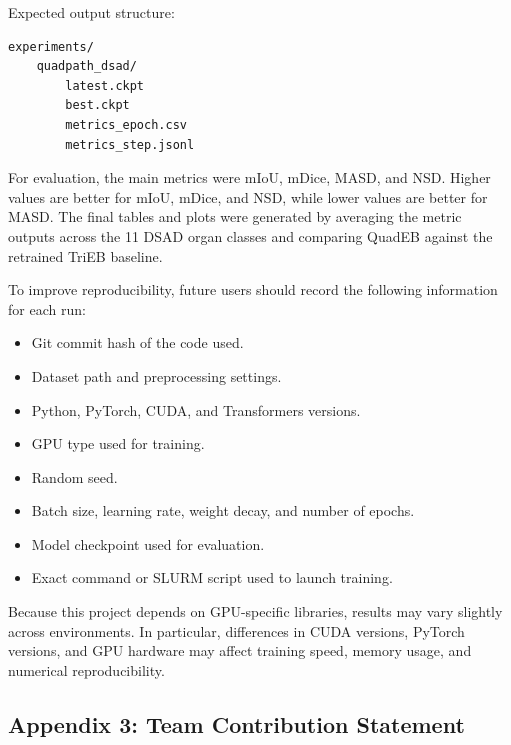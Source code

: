 \documentclass[twocolumn]{article}
\begin{document}
Expected output structure:

\begin{verbatim}
experiments/
    quadpath_dsad/
        latest.ckpt
        best.ckpt
        metrics_epoch.csv
        metrics_step.jsonl
\end{verbatim}

For evaluation, the main metrics were mIoU, mDice, MASD, and NSD. Higher values are better for mIoU, mDice, and NSD, while lower values are better for MASD. The final tables and plots were generated by averaging the metric outputs across the 11 DSAD organ classes and comparing QuadEB against the retrained TriEB baseline.

To improve reproducibility, future users should record the following information for each run:

\begin{itemize}
    \item Git commit hash of the code used.
    \item Dataset path and preprocessing settings.
    \item Python, PyTorch, CUDA, and Transformers versions.
    \item GPU type used for training.
    \item Random seed.
    \item Batch size, learning rate, weight decay, and number of epochs.
    \item Model checkpoint used for evaluation.
    \item Exact command or SLURM script used to launch training.
\end{itemize}

Because this project depends on GPU-specific libraries, results may vary slightly across environments. In particular, differences in CUDA versions, PyTorch versions, and GPU hardware may affect training speed, memory usage, and numerical reproducibility.

\subsection{Appendix 3: Team Contribution Statement}
\end{document}
